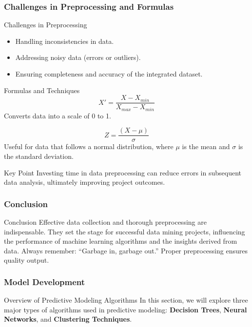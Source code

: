 \documentclass[aspectratio=169]{beamer}
\begin{document}
\begin{frame}[fragile]
    \frametitle{Challenges in Preprocessing and Formulas}
    \begin{block}{Challenges in Preprocessing}
        \begin{itemize}
            \item Handling inconsistencies in data.
            \item Addressing noisy data (errors or outliers).
            \item Ensuring completeness and accuracy of the integrated dataset.
        \end{itemize}
    \end{block}
    
    \begin{block}{Formulas and Techniques}
        \begin{equation}
        X' = \frac{X - X_{min}}{X_{max} - X_{min}}
        \end{equation}
        Converts data into a scale of 0 to 1.
        
        \begin{equation}
        Z = \frac{(X - \mu)}{\sigma}
        \end{equation}
        Useful for data that follows a normal distribution, where \( \mu \) is the mean and \( \sigma \) is the standard deviation.
    \end{block}
    
    \begin{block}{Key Point}
        Investing time in data preprocessing can reduce errors in subsequent data analysis, ultimately improving project outcomes.
    \end{block}
\end{frame}

\begin{frame}[fragile]
    \frametitle{Conclusion}
    \begin{block}{Conclusion}
        Effective data collection and thorough preprocessing are indispensable. They set the stage for successful data mining projects, influencing the performance of machine learning algorithms and the insights derived from data. 
        Always remember: ``Garbage in, garbage out.'' Proper preprocessing ensures quality output.
    \end{block}
\end{frame}

\begin{frame}[fragile]
    \frametitle{Model Development}
    \begin{block}{Overview of Predictive Modeling Algorithms}
        In this section, we will explore three major types of algorithms used in predictive modeling: 
        \textbf{Decision Trees}, \textbf{Neural Networks}, and \textbf{Clustering Techniques}.
    \end{block}
\end{frame}
\end{document}

